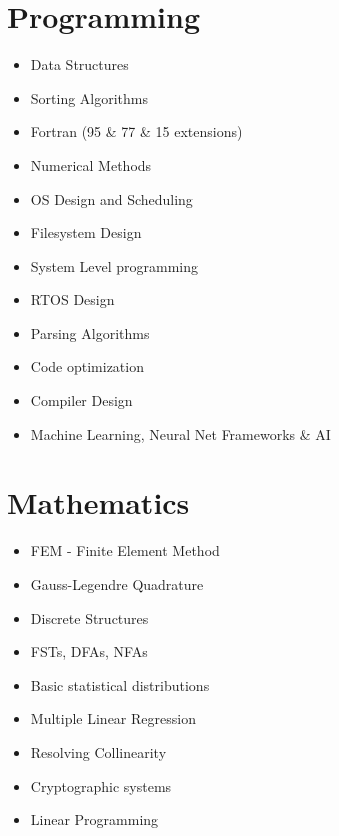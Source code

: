 \documentclass[a4paper]{article}
\begin{document}
\section{Programming}
\begin{itemize}
\item Data Structures
\item Sorting Algorithms
\item Fortran (95 \& 77 \& 15 extensions)
\item Numerical Methods
\item OS Design and Scheduling
\item Filesystem Design
\item System Level programming
\item RTOS Design
\item Parsing Algorithms
\item Code optimization
\item Compiler Design
\item Machine Learning, Neural Net Frameworks \& AI
\end{itemize}

\section{Mathematics}
\begin{itemize}
\item FEM - Finite Element Method
\item Gauss-Legendre Quadrature
\item Discrete Structures
\item FSTs, DFAs, NFAs
\item Basic statistical distributions
\item Multiple Linear Regression
\item Resolving Collinearity
\item Cryptographic systems
\item Linear Programming
\end{itemize}

\end{document}
